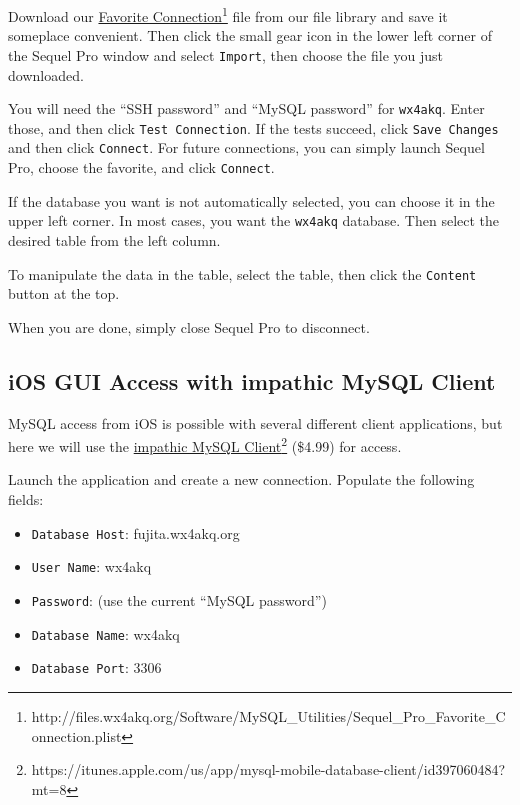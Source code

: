 \documentclass[pdflatex,letterpaper,twoside,12pt]{book}
\begin{document}
Download our \href{http://files.wx4akq.org/Software/MySQL\_Utilities/Sequel\_Pro\_Favorite\_Connection.plist}{Favorite Connection}\footnote{http://files.wx4akq.org/Software/MySQL\_Utilities/Sequel\_Pro\_Favorite\_Connection.plist} file from our file library and save it someplace convenient.  Then click the small gear icon in the lower left corner of the Sequel Pro window and select \texttt{Import}, then choose the file you just downloaded.

You will need the ``SSH password'' and ``MySQL password'' for \texttt{wx4akq}.  Enter those, and then click \texttt{Test Connection}.  If the tests succeed, click \texttt{Save Changes} and then click \texttt{Connect}.  For future connections, you can simply launch Sequel Pro, choose the favorite, and click \texttt{Connect}.

If the database you want is not automatically selected, you can choose it in the upper left corner.  In most cases, you want the \texttt{wx4akq} database.  Then select the desired table from the left column.

To manipulate the data in the table, select the table, then click the \texttt{Content} button at the top.

When you are done, simply close Sequel Pro to disconnect.

\subsection{iOS GUI Access with impathic MySQL Client}

MySQL access from iOS is possible with several different client applications, but here we will use the \href{https://itunes.apple.com/us/app/mysql-mobile-database-client/id397060484?mt=8}{impathic MySQL Client}\footnote{https://itunes.apple.com/us/app/mysql-mobile-database-client/id397060484?mt=8} (\$4.99) for access.

Launch the application and create a new connection.  Populate the following fields:

\begin{itemize}
\item \texttt{Database Host}: fujita.wx4akq.org
\item \texttt{User Name}: wx4akq
\item \texttt{Password}: (use the current ``MySQL password'')
\item \texttt{Database Name}: wx4akq
\item \texttt{Database Port}: 3306
\end{itemize}
\end{document}
